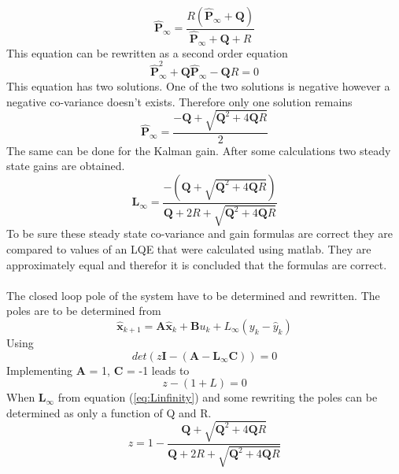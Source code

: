 \begin{equation}
    \hat{\textbf{P}}_{\infty} = \frac{R(\hat{\textbf{P}}_{\infty}+\textbf{Q})}{\hat{\textbf{P}}_{\infty}+\textbf{Q}+R}
\end{equation}
This equation can be rewritten as a second order equation
\begin{equation}
    \hat{\textbf{P}}_{\infty}^{2} + \textbf{Q}\hat{\textbf{P}}_{\infty}-\textbf{Q}R = 0
\end{equation}
This equation has two solutions. One of the two solutions is negative however a negative co-variance doesn't exists. Therefore only one solution remains
\begin{equation}
    \hat{\textbf{P}}_{\infty} = \frac{-\textbf{Q}+\sqrt{\textbf{Q}^{2}+4\textbf{Q}R}}{2}
\end{equation}
The same can be done for the Kalman gain. After some calculations two steady state gains are obtained.
\begin{equation}
    \textbf{L}_{\infty} = \frac{-(\textbf{Q}+\sqrt{\textbf{Q}^{2}+4\textbf{Q}R})}{\textbf{Q}+2R+\sqrt{\textbf{Q}^{2}+4\textbf{Q}R}}
\end{equation}
To be sure these steady state co-variance and gain formulas are correct they are compared to values of an LQE that were calculated using matlab. They are approximately equal and therefor it is concluded that the formulas are correct.\\
\\
The closed loop pole of the system have to be determined and rewritten. The poles are to be determined from
\begin{equation}
    \hat{\textbf{x}}_{k+1} = \textbf{A}\hat{\textbf{x}}_{k} + \textbf{B} u_{k} + L_{\infty}(y_{k}-\hat{y}_{k})
    \label{eq:Linfinity}
\end{equation}
Using 
\begin{equation}
    det(z\textbf{I} - (\textbf{A}-\textbf{L}_{\infty}\textbf{C})) = 0
\end{equation}
Implementing \textbf{A} = 1, \textbf{C} = -1 leads to
\begin{equation}
\label{eq:easyzifvL}
    z - (1+L) = 0
\end{equation}
When $\textbf{L}_{\infty}$ from equation (\ref{eq:Linfinity}) and some rewriting the poles can be determined as only a function of Q and R.
\begin{equation}
    z = 1 - \frac{\textbf{Q}+\sqrt{\textbf{Q}^{2}+4\textbf{Q}R}}{\textbf{Q}+2R+\sqrt{\textbf{Q}^{2}+4\textbf{Q}R}}
\end{equation}
